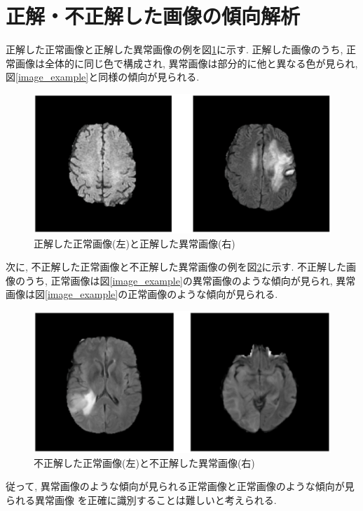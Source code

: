 	\section{正解・不正解した画像の傾向解析}
	正解した正常画像と正解した異常画像の例を図\ref{correct_example}に示す.
	正解した画像のうち, 正常画像は全体的に同じ色で構成され,
	異常画像は部分的に他と異なる色が見られ,
	図\ref{image_example}と同様の傾向が見られる.

	\begin{figure}[htbp]
		\begin{center}
			\includegraphics[width=12cm]{correct_images.eps}
			\caption{正解した正常画像(左)と正解した異常画像(右)}
			\label{correct_example}
		\end{center}
	\end{figure}

	次に, 不正解した正常画像と不正解した異常画像の例を図\ref{wrong_example}に示す.
	不正解した画像のうち, 正常画像は図\ref{image_example}の異常画像のような傾向が見られ,
	異常画像は図\ref{image_example}の正常画像のような傾向が見られる.

	\begin{figure}[htbp]
		\begin{center}
			\includegraphics[width=12cm]{wrong_images.eps}
			\caption{不正解した正常画像(左)と不正解した異常画像(右)}
			\label{wrong_example}
		\end{center}
	\end{figure}


	従って, 異常画像のような傾向が見られる正常画像と正常画像のような傾向が見られる異常画像
	を正確に識別することは難しいと考えられる.


